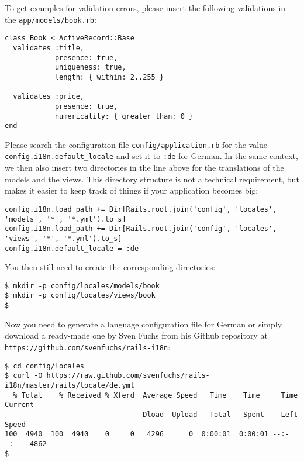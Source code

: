 \documentclass[a4paper]{book}
\begin{document}
To get examples for validation errors, please insert the following validations in the \texttt{app/models/book.rb}:

\begin{shaded}\begin{verbatim}
class Book < ActiveRecord::Base
  validates :title,
            presence: true,
            uniqueness: true,
            length: { within: 2..255 }

  validates :price,
            presence: true,
            numericality: { greater_than: 0 }
end
\end{verbatim}\end{shaded}

Please search the configuration file \texttt{config/application.rb} for the value \texttt{config.i18n.default\_locale} and set it to \texttt{:de} for German. In the same context, we then also insert two directories in the line above for the translations of the models and the views. This directory structure is not a technical requirement, but makes it easier to keep track of things if your application becomes big:

\begin{shaded}\begin{verbatim}
config.i18n.load_path += Dir[Rails.root.join('config', 'locales', 'models', '*', '*.yml').to_s]
config.i18n.load_path += Dir[Rails.root.join('config', 'locales', 'views', '*', '*.yml').to_s]
config.i18n.default_locale = :de
\end{verbatim}\end{shaded}

You then still need to create the corresponding directories:

\begin{shaded}\begin{verbatim}
$ mkdir -p config/locales/models/book
$ mkdir -p config/locales/views/book
$
\end{verbatim}\end{shaded}

Now you need to generate a language configuration file for German or simply download a ready-made one by Sven Fuchs from his Github repository at \texttt{https://github.com/svenfuchs/rails-i18n}:

\begin{shaded}\begin{verbatim}
$ cd config/locales
$ curl -O https://raw.github.com/svenfuchs/rails-i18n/master/rails/locale/de.yml
  % Total    % Received % Xferd  Average Speed   Time    Time     Time  Current
                                 Dload  Upload   Total   Spent    Left  Speed
100  4940  100  4940    0     0   4296      0  0:00:01  0:00:01 --:--:--  4862
$
\end{verbatim}\end{shaded}
\end{document}
